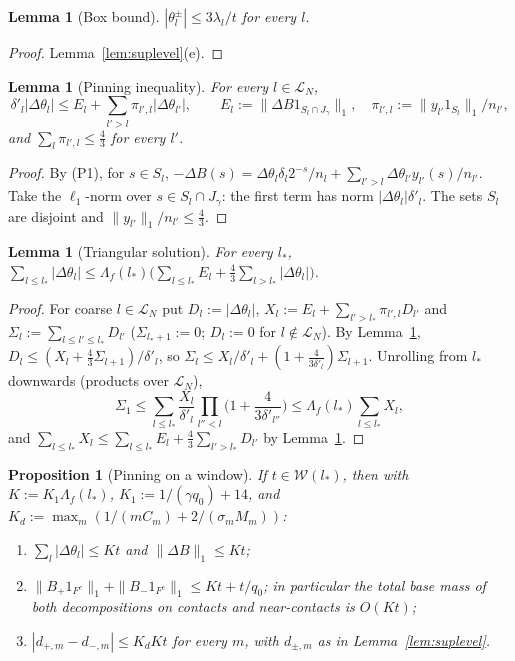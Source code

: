 \documentclass[10pt]{amsart}
\newtheorem{lemma}[theorem]{Lemma}
\newtheorem{proposition}[theorem]{Proposition}
\theoremstyle{definition}
\theoremstyle{remark}
\begin{document}
\begin{lemma}[Box bound]\label{lem:box}
$|\theta^\pm_l|\le3\lambda_l/t$ for every $l$.
\end{lemma}

\begin{proof}
Lemma~\ref{lem:suplevel}(e).
\end{proof}

\begin{lemma}[Pinning inequality]\label{lem:pinning}
For every $l\in\mathcal L_N$,
\[
 \delta'_l|\Delta\theta_l|\le E_l+\sum_{l'>l}\pi_{l',l}|\Delta\theta_{l'}|,\qquad
 E_l:=\|\Delta B1_{S_l\cap J_\gamma}\|_1,\quad\pi_{l',l}:=
 \|y_{l'}1_{S_l}\|_1/n_{l'},
\]
and $\sum_l\pi_{l',l}\le\frac43$ for every $l'$.
\end{lemma}

\begin{proof}
By (P1), for $s\in S_l$,
$-\Delta B(s)=\Delta\theta_l\delta_l2^{-s}/n_l+\sum_{l'>l}\Delta\theta_{l'}y_{l'}(s)/
n_{l'}$.  Take the $\ell_1$-norm over $s\in S_l\cap J_\gamma$: the first term
has norm $|\Delta\theta_l|\delta'_l$.  The sets $S_l$ are disjoint and
$\|y_{l'}\|_1/n_{l'}\le\frac43$.
\end{proof}

\begin{lemma}[Triangular solution]\label{lem:triangular}
For every $l_*$,
$\displaystyle\sum_{l\le l_*}|\Delta\theta_l|\le\Lambda_f(l_*)\Big(\sum_{l\le
l_*}E_l+\frac43\sum_{l>l_*}|\Delta\theta_l|\Big)$.
\end{lemma}

\begin{proof}
For coarse $l\in\mathcal L_N$ put $D_l:=|\Delta\theta_l|$, $X_l:=E_l+
\sum_{l'>l_*}\pi_{l',l}D_{l'}$ and $\Sigma_l:=\sum_{l\le l'\le l_*}D_{l'}$
($\Sigma_{l_*+1}:=0$; $D_l:=0$ for $l\notin\mathcal L_N$).  By
Lemma~\ref{lem:pinning}, $D_l\le(X_l+\frac43\Sigma_{l+1})/\delta'_l$, so
$\Sigma_l\le X_l/\delta'_l+(1+\frac4{3\delta'_l})\Sigma_{l+1}$.  Unrolling
from $l_*$ downwards (products over $\mathcal L_N$),
\[
 \Sigma_1\le\sum_{l\le l_*}\frac{X_l}{\delta'_l}\prod_{l''<l}
 \Big(1+\frac4{3\delta'_{l''}}\Big)\le\Lambda_f(l_*)\sum_{l\le l_*}X_l,
\]
and $\sum_{l\le l_*}X_l\le\sum_{l\le l_*}E_l+\frac43
\sum_{l'>l_*}D_{l'}$ by Lemma~\ref{lem:pinning}.
\end{proof}

\begin{proposition}[Pinning on a window]\label{prop:pinned}
If $t\in\mathcal W(l_*)$, then with $K:=K_1\Lambda_f(l_*)$,
$K_1:=1/(\gamma q_0)+14$, and $K_d:=\max_m(1/(mC_m)+2/(\sigma_mM_m))$:
\begin{enumerate}
\item[(a)] $\sum_l|\Delta\theta_l|\le Kt$ and $\|\Delta B\|_1\le Kt$;
\item[(b)] $\|B_+1_{F^c}\|_1+\|B_-1_{F^c}\|_1\le Kt+t/q_0$; in particular the
total base mass of both decompositions on contacts and near-contacts is
$O(Kt)$;
\item[(c)] $|d_{+,m}-d_{-,m}|\le K_dKt$ for every $m$, with $d_{\pm,m}$ as in
Lemma~\ref{lem:suplevel}.
\end{enumerate}
\end{proposition}
\end{document}
